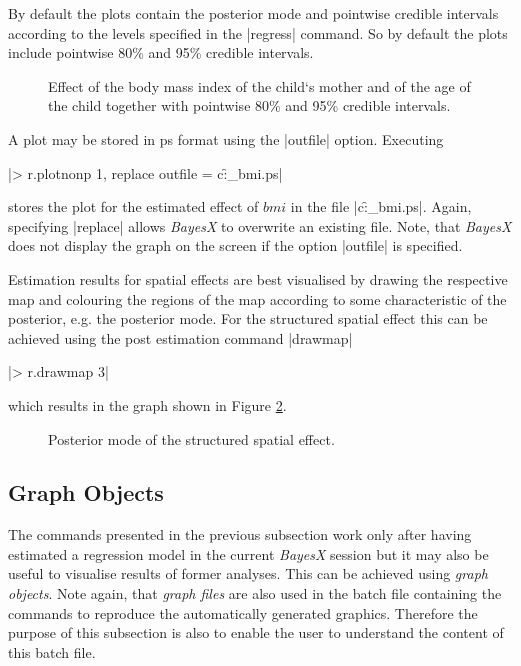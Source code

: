 \documentclass[a4paper]{article}
\begin{document}
By default the plots contain the posterior mode and pointwise
credible intervals according to the levels specified in the
|regress| command. So by default the plots include pointwise 80\%
and 95\% credible intervals.

\begin{figure}[ht]
\begin{center}
 {\it\caption{Effect of
the body mass index of the child`s mother and of the age of the
child together with pointwise 80\% and 95\% credible intervals.
\label{bmi1}}}
\end{center}
\end{figure}

A plot may be stored in ps format using the |outfile| option.
Executing

|> r.plotnonp 1, replace outfile = c:\data\f_bmi.ps|

stores the plot for the estimated effect of $bmi$ in the file
|c:\data\f_bmi.ps|. Again, specifying |replace| allows {\it
BayesX} to overwrite an existing file. Note, that {\it BayesX}
does not display the graph on the screen if the option |outfile|
is specified.

Estimation results for spatial effects are best visualised by
drawing the respective map and colouring the regions of the map
according to some characteristic of the posterior, e.g. the
posterior mode. For the structured spatial effect this can be
achieved using the post estimation command |drawmap|

|> r.drawmap 3|

which results in the graph shown in Figure \ref{spat1}.

\begin{figure}[ht]
\begin{center}
{\it\caption{Posterior mode of the structured spatial
effect.\label{spat1}}}
\end{center}
\end{figure}


\subsection{Graph Objects}

The commands presented in the previous subsection work only after
having estimated a regression model in the current {\em BayesX}
session but it may also be useful to visualise results of former
analyses. This can be achieved using {\em graph objects}. Note
again, that {\em graph files} are also used in the batch file
containing the commands to reproduce the automatically generated
graphics. Therefore the purpose of this subsection is also to enable
the user to understand the content of this batch file.
\end{document}
